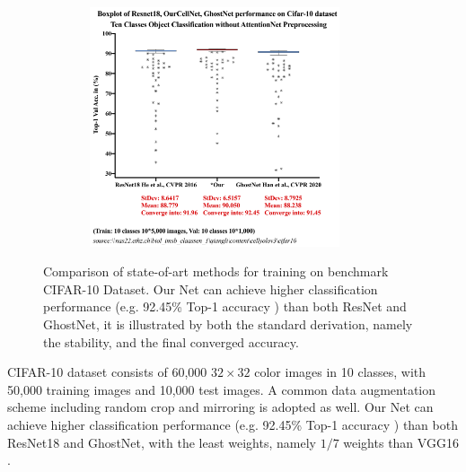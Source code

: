 \begin{figure}[h]
\centering
\includegraphics[height=200pt, width=0.9\textwidth]{thesis-template-master/images/Cifar-12-06-2020.png}
\label{fig}
\centering
\caption{Comparison of state-of-art methods for training on benchmark CIFAR-10 Dataset. Our Net can achieve higher classification performance  (e.g.  92.45\%  Top-1  accuracy ) than both ResNet and GhostNet, it is illustrated by both the standard derivation, namely the stability, and the final converged accuracy.}
\end{figure}
CIFAR-10 dataset\cite{b21} consists of 60,000 $32 \times 32$ color images in 10 classes, with 50,000 training images and 10,000 test images. A common data augmentation scheme including random crop\cite{b22} and mirroring\cite{b19} is adopted as well. Our Net can achieve higher classification performance  (e.g.  92.45\%  Top-1  accuracy  ) than both ResNet18 and GhostNet, with the least  weights, namely $1/7$ weights than VGG16 \cite{b23}. 



